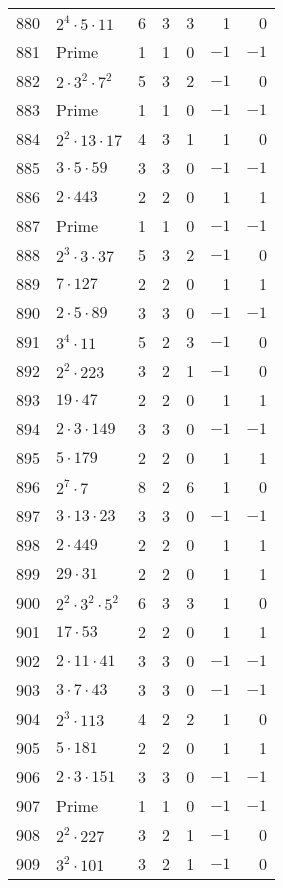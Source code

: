 \documentclass[12pt]{article}
\begin{document}
\begin{tabular}{|r|l|r|r|r|r|r|}
880 & $2^4 \cdot 5 \cdot 11$ & 6 & 3 & 3 & 1 & 0 \\
881 & Prime & 1 & 1 & 0 & $-1$ & $-1$ \\
882 & $2 \cdot 3^2 \cdot 7^2$ & 5 & 3 & 2 & $-1$ & 0 \\
883 & Prime & 1 & 1 & 0 & $-1$ & $-1$ \\
884 & $2^2 \cdot 13 \cdot 17$ & 4 & 3 & 1 & 1 & 0 \\
885 & $3 \cdot 5 \cdot 59$ & 3 & 3 & 0 & $-1$ & $-1$ \\
886 & $2 \cdot 443$ & 2 & 2 & 0 & 1 & 1 \\
887 & Prime & 1 & 1 & 0 & $-1$ & $-1$ \\
888 & $2^3 \cdot 3 \cdot 37$ & 5 & 3 & 2 & $-1$ & 0 \\
889 & $7 \cdot 127$ & 2 & 2 & 0 & 1 & 1 \\
890 & $2 \cdot 5 \cdot 89$ & 3 & 3 & 0 & $-1$ & $-1$ \\
891 & $3^4 \cdot 11$ & 5 & 2 & 3 & $-1$ & 0 \\
892 & $2^2 \cdot 223$ & 3 & 2 & 1 & $-1$ & 0 \\
893 & $19 \cdot 47$ & 2 & 2 & 0 & 1 & 1 \\
894 & $2 \cdot 3 \cdot 149$ & 3 & 3 & 0 & $-1$ & $-1$ \\
895 & $5 \cdot 179$ & 2 & 2 & 0 & 1 & 1 \\
896 & $2^7 \cdot 7$ & 8 & 2 & 6 & 1 & 0 \\
897 & $3 \cdot 13 \cdot 23$ & 3 & 3 & 0 & $-1$ & $-1$ \\
898 & $2 \cdot 449$ & 2 & 2 & 0 & 1 & 1 \\
899 & $29 \cdot 31$ & 2 & 2 & 0 & 1 & 1 \\
900 & $2^2 \cdot 3^2 \cdot 5^2$ & 6 & 3 & 3 & 1 & 0 \\
901 & $17 \cdot 53$ & 2 & 2 & 0 & 1 & 1 \\
902 & $2 \cdot 11 \cdot 41$ & 3 & 3 & 0 & $-1$ & $-1$ \\
903 & $3 \cdot 7 \cdot 43$ & 3 & 3 & 0 & $-1$ & $-1$ \\
904 & $2^3 \cdot 113$ & 4 & 2 & 2 & 1 & 0 \\
905 & $5 \cdot 181$ & 2 & 2 & 0 & 1 & 1 \\
906 & $2 \cdot 3 \cdot 151$ & 3 & 3 & 0 & $-1$ & $-1$ \\
907 & Prime & 1 & 1 & 0 & $-1$ & $-1$ \\
908 & $2^2 \cdot 227$ & 3 & 2 & 1 & $-1$ & 0 \\
909 & $3^2 \cdot 101$ & 3 & 2 & 1 & $-1$ & 0 \\

\end{tabular}
\end{document}
